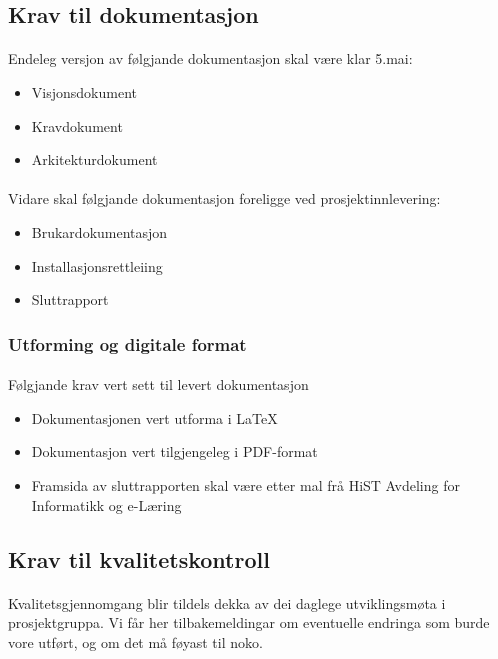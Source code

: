 \documentclass[nynorsk,12pt,a4paper]{article}
\begin{document}
\subsection{Krav til dokumentasjon}
\paragraph{}
Endeleg versjon av følgjande dokumentasjon skal være klar 5.mai:
\begin{itemize}
	\item Visjonsdokument
	\item Kravdokument
	\item Arkitekturdokument
\end{itemize}
\paragraph{}
Vidare skal følgjande dokumentasjon foreligge ved prosjektinnlevering:
\begin{itemize}
	\item Brukardokumentasjon
	\item Installasjonsrettleiing
	\item Sluttrapport
\end{itemize}

\subsubsection{Utforming og digitale format}
\paragraph{}
Følgjande krav vert sett til levert dokumentasjon
\begin{itemize}
	\item Dokumentasjonen vert utforma i \LaTeX
	\item Dokumentasjon vert tilgjengeleg i PDF-format
	\item Framsida av sluttrapporten skal være etter mal frå HiST Avdeling for Informatikk og e-Læring
\end{itemize}

\subsection{Krav til kvalitetskontroll}
\paragraph{}
Kvalitetsgjennomgang blir tildels dekka av dei daglege utviklingsmøta i prosjektgruppa. Vi får her tilbakemeldingar om eventuelle endringa som burde vore utført, og om det må føyast til noko. 
\end{document}
